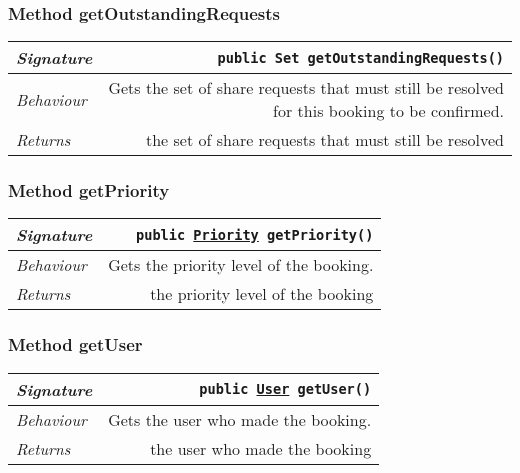 \begin{adjustwidth}{1.5em}{0pt}
\begin{adjustwidth}{1.5em}{0pt}
\begin{adjustwidth}{1.5em}{0pt}
{\begin{tabularx}{1.0\linewidth}{@{}l R@{}}
      \end{tabularx}}
    \end{adjustwidth}\subsubsection{Method getOutstandingRequests\label{edu.kit.hci.soli.domain.Booking@getOutstandingRequests()}}
    \begin{adjustwidth}{1.5em}{0pt}
      {\begin{tabularx}{1.0\linewidth}{@{}l R@{}}
        \emph{Signature} & \texttt{public \texttt{Set} getOutstandingRequests()} \\
        \hline
        \emph{Behaviour} & Gets the set of share requests that must still be resolved for this booking to be confirmed.    \\
        \hline
        \emph{Returns} & the set of share requests that must still be resolved  \\
        \hline
  
      \end{tabularx}}
    \end{adjustwidth}\subsubsection{Method getPriority\label{edu.kit.hci.soli.domain.Booking@getPriority()}}
    \begin{adjustwidth}{1.5em}{0pt}
      {\begin{tabularx}{1.0\linewidth}{@{}l R@{}}
        \emph{Signature} & \texttt{public \texttt{\hyperref[edu.kit.hci.soli.domain.Priority]{\texttt{Priority}}} getPriority()} \\
        \hline
        \emph{Behaviour} & Gets the priority level of the booking.    \\
        \hline
        \emph{Returns} & the priority level of the booking  \\
        \hline
  
      \end{tabularx}}
    \end{adjustwidth}\subsubsection{Method getUser\label{edu.kit.hci.soli.domain.Booking@getUser()}}
    \begin{adjustwidth}{1.5em}{0pt}
      {\begin{tabularx}{1.0\linewidth}{@{}l R@{}}
        \emph{Signature} & \texttt{public \texttt{\hyperref[edu.kit.hci.soli.domain.User]{\texttt{User}}} getUser()} \\
        \hline
        \emph{Behaviour} & Gets the user who made the booking.    \\
        \hline
        \emph{Returns} & the user who made the booking  \\
        \hline
  

\end{tabularx}}
\end{adjustwidth}
\end{adjustwidth}
\end{adjustwidth}
